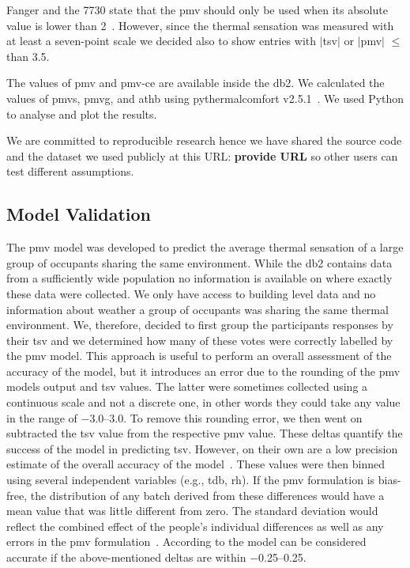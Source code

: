 Fanger and the \gls{7730} state that the \ac{pmv} should only be used when its absolute value is lower than 2~\cite{Fanger1970, iso7730}.
However, since the thermal sensation was measured with at least a seven-point scale we decided also to show entries with $|$\ac{tsv}$|$ or $|$\ac{pmv}$|$ $\leq$ than \num{3.5}.

The values of \ac{pmv} and \gls{pmv-ce} are available inside the \gls{db2}.
We calculated the values of \gls{pmvs}, \gls{pmvg}, and \ac{athb} using pythermalcomfort v2.5.1~\cite{Tartarini2020a}.
We used Python to analyse and plot the results.

We are committed to reproducible research hence we have shared the source code and the dataset we used publicly at this URL: \textbf{provide URL} so other users can test different assumptions.

\subsection{Model Validation}\label{subsec:model-validation}
The \ac{pmv} model was developed to predict the average thermal sensation of a large group of occupants sharing the same environment.
While the \gls{db2} contains data from a sufficiently wide population no information is available on where exactly these data were collected.
We only have access to building level data and no information about weather a group of occupants was sharing the same thermal environment.
We, therefore, decided to first group the participants responses by their \ac{tsv} and we determined how many of these votes were correctly labelled by the \ac{pmv} model.
This approach is useful to perform an overall assessment of the accuracy of the model, but it introduces an error due to the rounding of the \ac{pmv} models output and \ac{tsv} values.
The latter were sometimes collected using a continuous scale and not a discrete one, in other words they could take any value in the range of \numrange{-3.0}{3.0}.
To remove this rounding error, we then went on subtracted the \ac{tsv} value from the respective \ac{pmv} value.
These deltas quantify the success of the model in predicting \ac{tsv}.
However, on their own are a low precision estimate of the overall accuracy of the model~\cite{Humphreys2002}.
These values were then binned using several independent variables (e.g., \ac{tdb}, \ac{rh}).
If the \ac{pmv} formulation is bias-free, the distribution of any batch derived from these differences would have a mean value that was little different from zero.
The standard deviation would reflect the combined effect of the people's individual differences as well as any errors in the \ac{pmv} formulation~\cite{Humphreys2002}.
According to  the model can be considered accurate if the above-mentioned deltas are within \numrange{-0.25}{0.25}.

